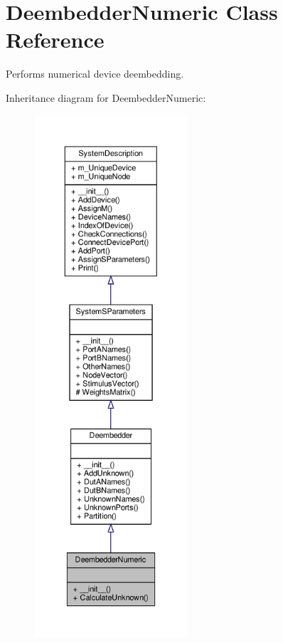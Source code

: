 \hypertarget{classSignalIntegrity_1_1SystemDescriptions_1_1DeembedderNumeric_1_1DeembedderNumeric}{}\section{Deembedder\+Numeric Class Reference}
\label{classSignalIntegrity_1_1SystemDescriptions_1_1DeembedderNumeric_1_1DeembedderNumeric}


Performs numerical device deembedding.  




Inheritance diagram for Deembedder\+Numeric\+:\nopagebreak
\begin{figure}[H]
\begin{center}
\leavevmode
\includegraphics[height=550pt]{classSignalIntegrity_1_1SystemDescriptions_1_1DeembedderNumeric_1_1DeembedderNumeric__inherit__graph}
\end{center}
\end{figure}


